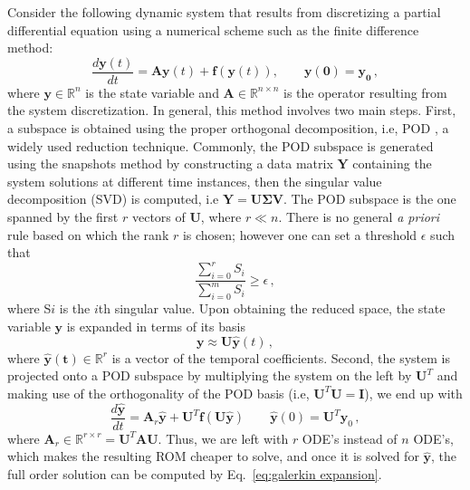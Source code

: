 \documentclass[]{interact}
\theoremstyle{plain}%
\theoremstyle{definition}
\theoremstyle{remark}
\begin{document}
Consider the following dynamic system that results from discretizing a partial differential equation using a numerical scheme such as the finite difference method:
\begin{equation}
	\frac{d\mathbf{y}(t)}{dt} = \mathbf{A}\mathbf{y}(t) + \mathbf{f}(\mathbf{y}(t)),  \quad\quad \mathbf{y(0) = \mathbf{y_0}} \, ,
	\label{eq:FOM}
\end{equation}
where $\mathbf{y} \in \mathbb{R}^{n}$ is the state variable and $\mathbf{A} \in \mathbb{R}^{n\times n}$ is the operator resulting from the system discretization.
In general, this method involves two main steps.
First, a subspace is obtained using the proper orthogonal decomposition, i.e, POD \cite{}, a widely used reduction technique.
Commonly, the POD subspace is generated using the snapshots method \cite{} by constructing a data matrix $\mathbf{Y}$ containing the system solutions at different time instances, then the singular value decomposition (SVD) is computed, i.e $\mathbf{Y} = \mathbf{U}\mathbf{\Sigma}\mathbf{V}$.
The POD subspace is the one spanned by the first $r$ vectors of $\mathbf{U}$, where $r \ll n$.
There is no general \textit{a priori} rule based on which the rank $r$ is chosen; however one can set a threshold $\epsilon$  such that
\begin{equation}
	\frac{\sum_{i=0}^r S_i}{\sum_{i=0}^m S_i} \ge \epsilon \, ,
\end{equation}
where S$i$ is the $i$th singular value.
Upon obtaining the reduced space, the state variable $\mathbf{y}$ is expanded in terms of its basis
\begin{equation}
	\mathbf{y} \approx \mathbf{U} \hat{\mathbf{y}}(t) \, ,
	\label{eq:galerkin expansion}
\end{equation}
where $\mathbf{\hat{y}(t)} \in \mathbb{R}^{r}$ is a vector of the temporal coefficients.
Second, the system is projected onto a POD subspace by multiplying the system on the left by $\mathbf{U}^T$ and making use of the orthogonality of the POD basis (i.e, $\mathbf{U}^T\mathbf{U} = \mathbf{I}$), we end up with 
\begin{equation}
	\frac{d\mathbf{\hat{y}}}{dt} = \mathbf{A}_r\mathbf{\hat{y}} + \mathbf{U}^T\mathbf{f}(\mathbf{U}\mathbf{\hat{y}}) \qquad \mathbf{\hat{y}}(0) = \mathbf{U}^T\mathbf{y}_0 \, ,
	\label{eq:ROM}
\end{equation}
where $\mathbf{A}_r \in \mathbb{R}^{r\times r} = \mathbf{U}^T\mathbf{A}\mathbf{U}.$
Thus, we are left with $r$ ODE's instead of $n$ ODE's, which makes the resulting ROM cheaper to solve, and once it is solved for $\mathbf{\hat{y}}$, the full order solution can be computed by Eq.~\ref{eq:galerkin expansion}.
\end{document}
